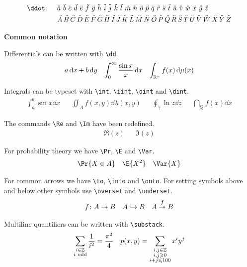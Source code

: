 \documentclass[parskip]{myarticle}
\begin{document}
\begin{align*}
    &\text{\texttt{\textbackslash ddot}: } &&\ddot{a}\,\,\ddot{b}\,\,\ddot{c}\,\,\ddot{d}\,\,\ddot{e}\,\,\ddot{f}\,\,\ddot{g}\,\,\ddot{h}\,\,\ddot{i}\,\,\ddot{j}\,\,\ddot{k}\,\,\ddot{l}\,\,\ddot{m}\,\,\ddot{n}\,\,\ddot{o}\,\,\ddot{p}\,\,\ddot{q}\,\,\ddot{r}\,\,\ddot{s}\,\,\ddot{t}\,\,\ddot{u}\,\,\ddot{v}\,\,\ddot{w}\,\,\ddot{x}\,\,\ddot{y}\,\,\ddot{z} \\
    &&&\ddot{A}\,\ddot{B}\,\ddot{C}\,\ddot{D}\,\ddot{E}\,\ddot{F}\,\ddot{G}\,\ddot{H}\,\ddot{I}\,\ddot{J}\,\ddot{K}\,\ddot{L}\,\ddot{M}\,\ddot{N}\,\ddot{O}\,\ddot{P}\,\ddot{Q}\,\ddot{R}\,\ddot{S}\,\ddot{T}\,\ddot{U}\,\ddot{V}\,\ddot{W}\,\ddot{X}\,\ddot{Y}\,\ddot{Z}
\end{align*}

\newpage

\textbf{Common notation}

Differentials can be written with \verb|\dd|.
\begin{align*}
    a\mathop{}\!\mathrm{d} x + b\mathop{}\!\mathrm{d} y && \int_0^\infty \frac{\sin x}{x} \mathop{}\!\mathrm{d} x && \int_{\mathbb{R}^n} f(x) \mathop{}\!\mathrm{d} \mu(x)
\end{align*}

Integrals can be typeset with \verb|\int|, \verb|\iint|, \verb|\oint| and \verb|\dint|.
\begin{align*}
    \int_a^b \sin x \dd x && \iint_A f(x, y) \dd \lambda(x, y) && \oint_\gamma \ln z \dd z && \dint_Q f(x) \dd x
\end{align*}

The commands \verb|\Re| and \verb|\Im| have been redefined.
\begin{align*}
    \Re(z) && \Im(z)
\end{align*}

For probability theory we have \verb|\Pr|, \verb|\E| and \verb|\Var|.
\begin{align*}
    \Pr{X \in A} && \E{X^2} && \Var{X}
\end{align*}

For common arrows we have \verb|\to|, \verb|\into| and \verb|\onto|. For setting symbols above and below other symbols use \verb|\overset| and \verb|\underset|.
\begin{align*}
    f \colon A \to B && A \hookrightarrow B && A \overset{f}{\twoheadrightarrow} B
\end{align*}

Multiline quantifiers can be written with \verb|\substack|.
\begin{align*}
    \sum_{\substack{i \in \mathbb{Z} \\ i~\text{odd}}} \frac{1}{i^2} = \frac{\pi^2}{4} && p(x, y) = \sum_{\substack{i, j \in \mathbb{Z} \\ i, j \geqslant 0 \\ i + j \leqslant 100}} x^i y^j
\end{align*}
\end{document}
